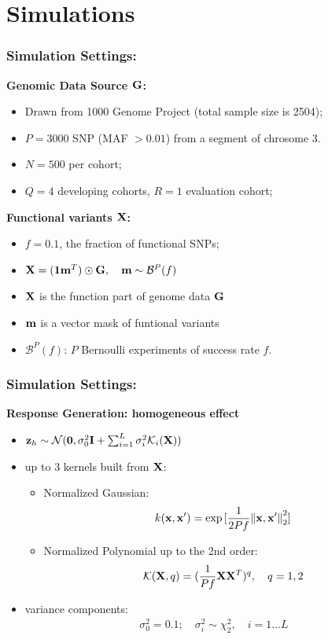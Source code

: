 \documentclass{beamer}
\begin{document}
\section{Simulations}
\begin{frame}
  \frametitle{Simulation Settings:} \textbf{Genomic Data Source
    $\mathbf{G}$:}
  \begin{itemize}
  \item Drawn from 1000 Genome Project (total sample size is 2504);
  \item $P=3000$ SNP (MAF $> 0.01$) from a segment of chrosome 3.
  \item $N=500$ per cohort;
  \item $Q=4$ developing cohorts, $R=1$ evaluation cohort;
  \end{itemize}
  \textbf{Functional variants $\mathbf{X}$:}
  \begin{itemize}
  \item $f = 0.1$, the fraction of functional SNPs;
  \item $\mathbf{X} = (\mathbf{1}\mathbf{m}^T) \odot \mathbf{G}, \quad \mathbf{m} \sim \mathcal{B}^P(f)$
  \item $\mathbf{X}$ is the function part of genome data $\mathbf{G}$
  \item $\mathbf{m}$ is a vector mask of funtional variants
  \item $\mathcal{B}^P(f)$: $P$ Bernoulli experiments of success rate
    $f$.
  \end{itemize}
\end{frame}
\begin{frame}
  \frametitle{Simulation Settings:}%
  \textbf{Response Generation: homogeneous effect}
  \begin{itemize}
  \item
    $ \mathbf{z}_h \sim \mathcal{N}(\boldsymbol{0}, \sigma^2_0 \textbf{I} + \sum_{i=1}^L
    \sigma_i^2 \mathcal{K}_i(\mathbf{X}))$
  \item up to 3 kernels built from $\mathbf{X}$:
    \begin{itemize}
    \item Normalized Gaussian:
      \begin{align}
        k(\mathbf{x}, \mathbf{x}^\prime)= \exp{[\frac{1}{2Pf}{\left\lVert\mathbf{x}, \mathbf{x}^\prime\right\rVert_2^2}]}
      \end{align}
    \item Normalized Polynomial up to the 2nd order:
      \begin{align}
        \mathcal{K}(\mathbf{X}, q)=(\frac{1}{Pf}\mathbf{X}\mathbf{X}^T)^q, \quad q={1, 2}
      \end{align}
    \end{itemize}
  \item variance components:
    \begin{align*}
      \sigma_0^2 = 0.1; \quad \sigma^2_i \sim \chi^2_2, \quad i = 1 \dots L
    \end{align*}
  \end{itemize}
\end{frame}
\end{document}
